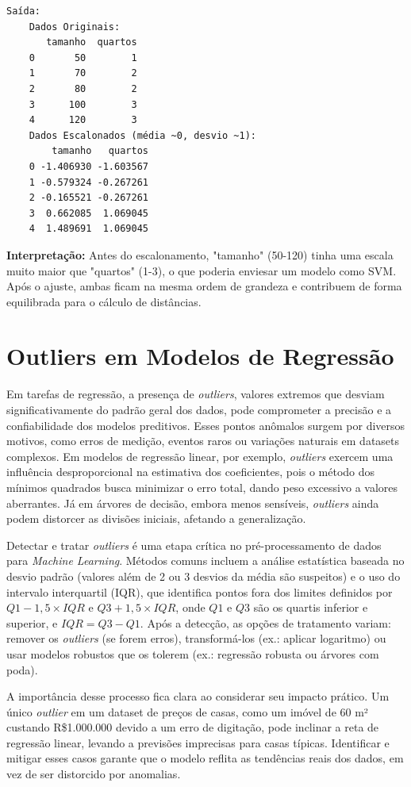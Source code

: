 \documentclass[a4paper,12pt,openany]{book}
\begin{document}
\begin{verbatim}
Saída:
    Dados Originais:
       tamanho  quartos
    0       50        1
    1       70        2
    2       80        2
    3      100        3
    4      120        3
    Dados Escalonados (média ~0, desvio ~1):
        tamanho   quartos
    0 -1.406930 -1.603567
    1 -0.579324 -0.267261
    2 -0.165521 -0.267261
    3  0.662085  1.069045
    4  1.489691  1.069045
\end{verbatim}

\textbf{Interpretação:} Antes do escalonamento, "tamanho" (50-120) tinha uma escala muito maior que "quartos" (1-3), o que poderia enviesar um modelo como SVM. Após o ajuste, ambas ficam na mesma ordem de grandeza e contribuem de forma equilibrada para o cálculo de distâncias.

\section{Outliers em Modelos de Regressão}

Em tarefas de regressão, a presença de \textit{outliers}, valores extremos que desviam significativamente do padrão geral dos dados, pode comprometer a precisão e a confiabilidade dos modelos preditivos. Esses pontos anômalos surgem por diversos motivos, como erros de medição, eventos raros ou variações naturais em datasets complexos. Em modelos de regressão linear, por exemplo, \textit{outliers} exercem uma influência desproporcional na estimativa dos coeficientes, pois o método dos mínimos quadrados busca minimizar o erro total, dando peso excessivo a valores aberrantes. Já em árvores de decisão, embora menos sensíveis, \textit{outliers} ainda podem distorcer as divisões iniciais, afetando a generalização.

Detectar e tratar \textit{outliers} é uma etapa crítica no pré-processamento de dados para \textit{Machine Learning}. Métodos comuns incluem a análise estatística baseada no desvio padrão (valores além de 2 ou 3 desvios da média são suspeitos) e o uso do intervalo interquartil (IQR), que identifica pontos fora dos limites definidos por $Q1 - 1,5 \times IQR$ e $Q3 + 1,5 \times IQR$, onde $Q1$ e $Q3$ são os quartis inferior e superior, e $IQR = Q3 - Q1$. Após a detecção, as opções de tratamento variam: remover os \textit{outliers} (se forem erros), transformá-los (ex.: aplicar logaritmo) ou usar modelos robustos que os tolerem (ex.: regressão robusta ou árvores com poda).

A importância desse processo fica clara ao considerar seu impacto prático. Um único \textit{outlier} em um dataset de preços de casas, como um imóvel de 60 m² custando R\$1.000.000 devido a um erro de digitação, pode inclinar a reta de regressão linear, levando a previsões imprecisas para casas típicas. Identificar e mitigar esses casos garante que o modelo reflita as tendências reais dos dados, em vez de ser distorcido por anomalias.
\end{document}
